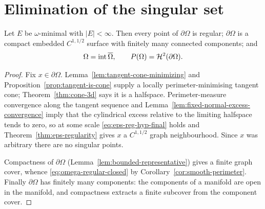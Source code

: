 \chapter{Elimination of the singular set}\label{ch:no-singular}

\begin{proposition}\label{prop:no-singular-points}
Let $E$ be $\omega$-minimal with $|E|<\infty$.  Then every point of
$\partial\Omega$ is regular; $\partial\Omega$ is a compact embedded
$C^{1,1/2}$ surface with finitely many connected components; and
\begin{equation}\label{eq:omega-regular-closed}
  \Omega=\operatorname{int}\overline\Omega,
  \qquad
  P(\Omega)=\mathcal H^2(\partial\Omega).
\end{equation}
\end{proposition}

\begin{proof}
Fix $x\in\partial\Omega$.  Lemma~\ref{lem:tangent-cone-minimizing} and
Proposition~\ref{prop:tangent-is-cone} supply a locally perimeter-minimising
tangent cone; Theorem~\ref{thm:cone-3d} says it is a halfspace.
Perimeter-measure convergence along the tangent sequence and
Lemma~\ref{lem:fixed-normal-excess-convergence} imply that the cylindrical
excess relative to the limiting halfspace tends to zero, so at
some scale \eqref{eq:eps-reg-hyp-final} holds and
Theorem~\ref{thm:eps-regularity} gives $x$ a $C^{1,1/2}$ graph
neighbourhood.  Since $x$ was arbitrary there are no singular points.

Compactness of $\partial\Omega$ (Lemma~\ref{lem:bounded-representative}) gives
a finite graph cover, whence \eqref{eq:omega-regular-closed} by
Corollary~\ref{cor:smooth-perimeter}.  Finally $\partial\Omega$ has finitely
many components: the components of a manifold are open in the manifold, and
compactness extracts a finite subcover from the component cover.
\end{proof}

